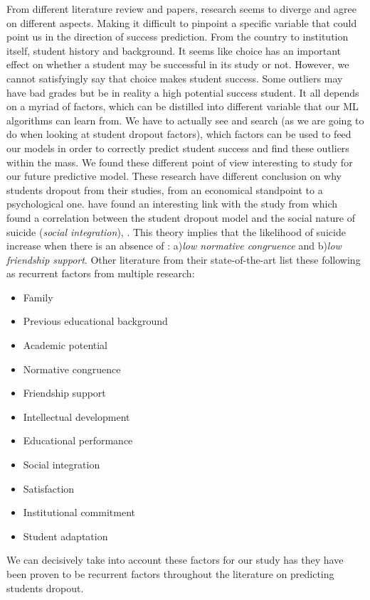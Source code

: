 \documentclass[../../main.tex]{subfiles}
\begin{document}
From different literature review and papers, research seems to diverge and agree on different aspects. Making it difficult to pinpoint a specific variable that could point us in the direction of success prediction. From the country to institution itself, student history and background. It seems like choice has an important effect on whether a student may be successful in its study or not. However, we cannot satisfyingly say that choice makes student success.  Some outliers may have bad grades but be in reality a high potential success student. It all depends on a myriad of factors, which can be distilled into different variable that our ML algorithms can learn from. We have to actually see and search (as we are going to do when looking at student dropout factors), which factors can be used to feed our models in order to correctly predict student success and find these outliers within the mass.\cite{kuh_what_2006, sa_how_2018}
We found these different point of view interesting to study for our future predictive model. These research have different conclusion on why students dropout from their studies, from an economical standpoint to a psychological one.\cite{opazo_analysis_2021} have found an interesting link with the study from\cite{spady_dropouts_1970} which found a correlation between the student dropout model and the social nature of suicide (\textit{social integration}), \cite{durkheim_suicide_1951}. This theory implies that the likelihood of suicide increase when there is an absence of : a)\textit{low normative congruence} and b)\textit{low friendship support}. Other literature from their state-of-the-art list these following as recurrent factors from multiple research\cite{opazo_analysis_2021,tinto_dropout_1975,caspersen_teachers_2015,lidia_problema_2006,bejarano_caso_2017,sinchi_acceso_2018,cavero_voluntad_2011,velasco_alisis_nodate}: 
\begin{itemize}
    \item Family
    \item Previous educational background
    \item Academic potential
    \item Normative congruence
    \item Friendship support
    \item Intellectual development
    \item Educational performance
    \item Social integration
    \item Satisfaction
    \item Institutional commitment
    \item Student adaptation
\end{itemize}
We can decisively take into account these factors for our study has they have been proven to be recurrent factors throughout the literature on predicting students dropout.
\end{document}
